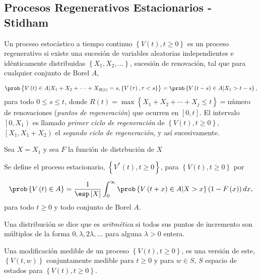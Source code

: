 \subsection{Procesos Regenerativos Estacionarios - Stidham \cite{Stidham}}


Un proceso estoc\'astico a tiempo continuo $\left\{V\left(t\right),t\geq0\right\}$ es un proceso regenerativo si existe una sucesi\'on de variables aleatorias independientes e id\'enticamente distribuidas $\left\{X_{1},X_{2},\ldots\right\}$, sucesi\'on de renovaci\'on, tal que para cualquier conjunto de Borel $A$, 

\begin{eqnarray*}
\prob\left\{V\left(t\right)\in A|X_{1}+X_{2}+\cdots+X_{R\left(t\right)}=s,\left\{V\left(\tau\right),\tau<s\right\}\right\}=\prob\left\{V\left(t-s\right)\in A|X_{1}>t-s\right\},
\end{eqnarray*}
para todo $0\leq s\leq t$, donde $R\left(t\right)=\max\left\{X_{1}+X_{2}+\cdots+X_{j}\leq t\right\}=$n\'umero de renovaciones ({\emph{puntos de regeneraci\'on}}) que ocurren en $\left[0,t\right]$. El intervalo $\left[0,X_{1}\right)$ es llamado {\emph{primer ciclo de regeneraci\'on}} de $\left\{V\left(t \right),t\geq0\right\}$, $\left[X_{1},X_{1}+X_{2}\right)$ el {\emph{segundo ciclo de regeneraci\'on}}, y as\'i sucesivamente.

Sea $X=X_{1}$ y sea $F$ la funci\'on de distrbuci\'on de $X$


\begin{Def}
Se define el proceso estacionario, $\left\{V^{*}\left(t\right),t\geq0\right\}$, para $\left\{V\left(t\right),t\geq0\right\}$ por

\begin{eqnarray*}
\prob\left\{V\left(t\right)\in A\right\}=\frac{1}{\esp\left[X\right]}\int_{0}^{\infty}\prob\left\{V\left(t+x\right)\in A|X>x\right\}\left(1-F\left(x\right)\right)dx,
\end{eqnarray*} 
para todo $t\geq0$ y todo conjunto de Borel $A$.
\end{Def}

\begin{Def}
Una distribuci\'on se dice que es {\emph{aritm\'etica}} si todos sus puntos de incremento son m\'ultiplos de la forma $0,\lambda, 2\lambda,\ldots$ para alguna $\lambda>0$ entera.
\end{Def}


\begin{Def}
Una modificaci\'on medible de un proceso $\left\{V\left(t\right),t\geq0\right\}$, es una versi\'on de este, $\left\{V\left(t,w\right)\right\}$ conjuntamente medible para $t\geq0$ y para $w\in S$, $S$ espacio de estados para $\left\{V\left(t\right),t\geq0\right\}$.
\end{Def}

